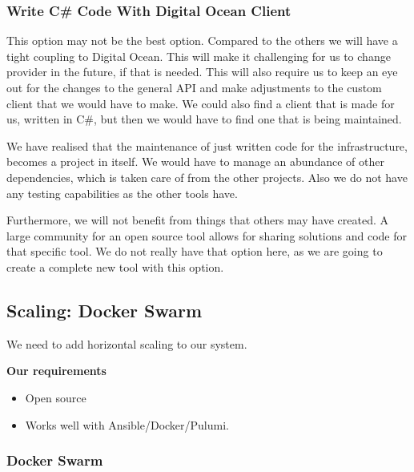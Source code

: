\subsubsection{Write C\# Code With Digital Ocean Client}

This option may not be the best option. Compared to the others we will have a tight coupling to Digital Ocean. This will make it challenging for us to change provider in the future, if that is needed. This will also require us to keep an eye out for the changes to the general API and make adjustments to the custom client that we would have to make. We could also find a client that is made for us, written in C\#, but then we would have to find one that is being maintained.

We have realised that the maintenance of just written code for the infrastructure, becomes a project in itself. We would have to manage an abundance of other dependencies, which is taken care of from the other projects. Also we do not have any testing capabilities as the other tools have.

Furthermore, we will not benefit from things that others may have created. A large community for an open source tool allows for sharing solutions and code for that specific tool. We do not really have that option here, as we are going to create a complete new tool with this option.

\subsection{Scaling: Docker Swarm}

We need to add horizontal scaling to our system.

\textbf{Our requirements}

\begin{itemize}
    \item Open source
    \item Works well with Ansible/Docker/Pulumi.
\end{itemize}

\subsubsection{Docker Swarm}

